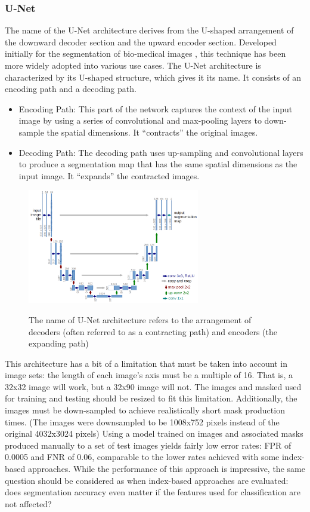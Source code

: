 \documentclass[letterpaper, notitlepage]{report}
\begin{document}
{\subsubsection{U-Net}
The name of the U-Net architecture derives from the U-shaped arrangement of the downward decoder section and the upward encoder section. Developed initially for the segmentation of bio-medical images \parencite{Ronneberger2015-ye}, this technique has been more widely adopted into various use cases. The U-Net architecture is characterized by its U-shaped structure, which gives it its name. It consists of an encoding path and a decoding path.
\begin{itemize}
	\item{Encoding Path: This part of the network captures the context of the input image by using a series of convolutional and max-pooling layers to down-sample the spatial dimensions. It “contracts” the original images.}
	\item{Decoding Path: The decoding path uses up-sampling and convolutional layers to produce a segmentation map that has the same spatial dimensions as the input image. It “expands” the contracted images.}
\end{itemize}

\begin{figure}[H]
	\centering
	\includegraphics[height=5cm]{figures/u-net-architecture.png}
	\label{fig:u-net}
	\caption[U-Net architecture]{The name of U-Net architecture refers to the arrangement of decoders (often referred to as a contracting path) and encoders (the expanding path)}
\end{figure}
This architecture has a bit of a limitation that must be taken into account in image sets: the length of each image's axis must be a multiple of 16. That is, a 32x32 image will work, but a 32x90 image will not. The images and masked used for training and testing should be resized to fit this limitation. Additionally, the images must be down-sampled to achieve realistically short mask production times. (The images were downsampled to be 1008x752 pixels instead of the original 4032x3024 pixels) Using a model trained on images and associated masks produced manually to a set of test images yields fairly low error rates: \gls{FPR} of 0.0005 and \gls{FNR} of 0.06, comparable to the lower rates achieved with some index-based approaches. While the performance of this approach is impressive, the same question should be considered as when index-based approaches are evaluated: does segmentation accuracy even matter if the features used for classification are not affected?

}
\end{document}
